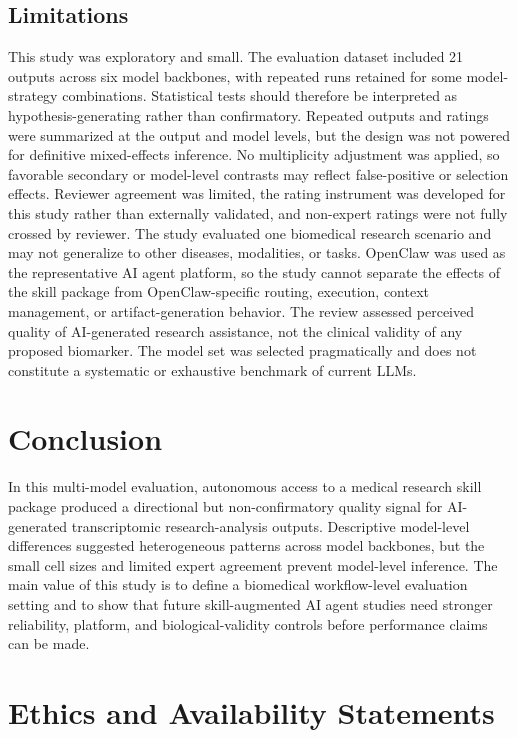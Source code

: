 \documentclass[11pt]{article}
\begin{document}
\subsection{Limitations}

This study was exploratory and small. The evaluation dataset included 21 outputs across six model backbones, with repeated runs retained for some model-strategy combinations. Statistical tests should therefore be interpreted as hypothesis-generating rather than confirmatory. Repeated outputs and ratings were summarized at the output and model levels, but the design was not powered for definitive mixed-effects inference. No multiplicity adjustment was applied, so favorable secondary or model-level contrasts may reflect false-positive or selection effects. Reviewer agreement was limited, the rating instrument was developed for this study rather than externally validated, and non-expert ratings were not fully crossed by reviewer. The study evaluated one biomedical research scenario and may not generalize to other diseases, modalities, or tasks. OpenClaw was used as the representative AI agent platform, so the study cannot separate the effects of the skill package from OpenClaw-specific routing, execution, context management, or artifact-generation behavior. The review assessed perceived quality of AI-generated research assistance, not the clinical validity of any proposed biomarker. The model set was selected pragmatically and does not constitute a systematic or exhaustive benchmark of current LLMs.

\section{Conclusion}

In this multi-model evaluation, autonomous access to a medical research skill package produced a directional but non-confirmatory quality signal for AI-generated transcriptomic research-analysis outputs. Descriptive model-level differences suggested heterogeneous patterns across model backbones, but the small cell sizes and limited expert agreement prevent model-level inference. The main value of this study is to define a biomedical workflow-level evaluation setting and to show that future skill-augmented AI agent studies need stronger reliability, platform, and biological-validity controls before performance claims can be made.

\section{Ethics and Availability Statements}
\end{document}
